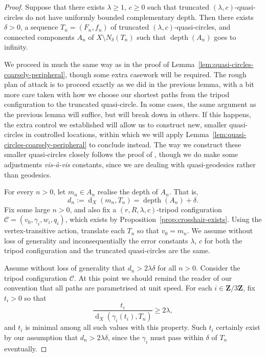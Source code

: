 \documentclass[11pt,a4paper]{amsart}
\DeclareMathOperator{\dist}{d}
\newcommand{\Z}{\mathbf{Z}}
\theoremstyle{definition}
\newcommand{\crosshair}{\mathcal{C}}
\DeclareMathOperator{\depth}{depth}
\begin{document}
\begin{proof}
    Suppose that there exists $\lambda \geq 1$, $c \geq 0$ such that truncated $(\lambda,c)$-quasi-circles do not have uniformly bounded complementary depth.  Then there exists $\delta > 0$, a sequence $T_n = (F_n, f_n)$ of truncated $(\lambda, c)$-quasi-circles, and connected components $A_n$ of $X \setminus N_\delta(T_n)$ such that $\depth(A_n)$ goes to infinity. 

    We proceed in much the same way as in the proof of Lemma~\ref{lem:quasi-circles-coarsely-peripheral}, though some extra casework will be required. The rough plan of attack is to proceed exactly as we did in the previous lemma, with a bit more care taken with how we choose our shortest paths from the tripod configuration to the truncated quasi-circle. In some cases, the same argument as the previous lemma will suffice, but will break down in others. If this happens, the extra control we established will allow us to construct new, smaller quasi-circles in controlled locations, within which we will apply Lemma~\ref{lem:quasi-circles-coarsely-peripheral} to conclude instead. The way we construct these smaller quasi-circles closely follows the proof of \cite[Prop.~5.1]{hume2020poorly}, though we do make some adjustments \emph{vis-\`a-vis} constants, since we are dealing with quasi-geodesics rather than geodesics.
    
    For every $n > 0$, let $m_n \in A_n$ realise the depth of $A_n$. That is, 
    $$
    d_n := \dist_X(m_n, T_n) = \depth(A_n) + \delta.
    $$
    Fix some large $n > 0$, and also fix a $(r,R,\lambda,c)$-tripod configuration $\crosshair = (v_0,\gamma_i, w_i,q_i)$, which exists by Proposition~\ref{prop:crosshair-exists}.  Using the vertex-transitive action, translate each $T_n$ so that $v_0 = m_n$. We assume without loss of generality and inconsequentially the error constants $\lambda$, $c$ for both the tripod configuration and the truncated quasi-circles are the same.

    Assume without loss of generality that $d_n > 2\lambda \delta$ for all $n > 0$. Consider the tripod configuration $\crosshair$. At this point we should remind the reader of our convention that all paths are parametrised at unit speed. For each $i \in \Z/3\Z$,  fix $t_i > 0$ so that 
    \begin{equation}\label{eq:t-i property}
        \frac{t_i}{\dist_X(\gamma_i(t_i), T_n)} \geq 2\lambda, 
    \end{equation}
    and $t_i$ is minimal among all such values with this property. Such $t_i$ certainly exist by our assumption that $d_n > 2\lambda \delta$, since the $\gamma_i$ must pass within $\delta$ of $T_n$ eventually.
    

\end{proof}
\end{document}
